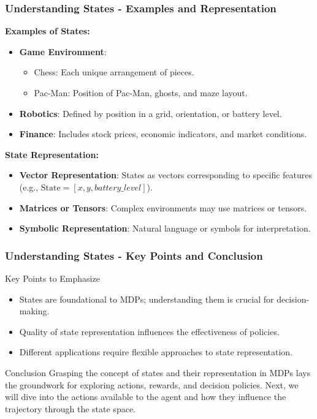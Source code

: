\documentclass[aspectratio=169]{beamer}
\begin{document}
\begin{frame}[fragile]
    \frametitle{Understanding States - Examples and Representation}
    \textbf{Examples of States:}
    \begin{itemize}
        \item \textbf{Game Environment}:
            \begin{itemize}
                \item Chess: Each unique arrangement of pieces.
                \item Pac-Man: Position of Pac-Man, ghosts, and maze layout.
            \end{itemize}
        \item \textbf{Robotics}: Defined by position in a grid, orientation, or battery level.
        \item \textbf{Finance}: Includes stock prices, economic indicators, and market conditions.
    \end{itemize}

    \textbf{State Representation:}
    \begin{itemize}
        \item \textbf{Vector Representation}: States as vectors corresponding to specific features (e.g., $\text{State} = [x, y, battery\_level]$).
        \item \textbf{Matrices or Tensors}: Complex environments may use matrices or tensors.
        \item \textbf{Symbolic Representation}: Natural language or symbols for interpretation.
    \end{itemize}
\end{frame}

\begin{frame}[fragile]
    \frametitle{Understanding States - Key Points and Conclusion}
    \begin{block}{Key Points to Emphasize}
        \begin{itemize}
            \item States are foundational to MDPs; understanding them is crucial for decision-making.
            \item Quality of state representation influences the effectiveness of policies.
            \item Different applications require flexible approaches to state representation.
        \end{itemize}
    \end{block}

    \begin{block}{Conclusion}
        Grasping the concept of states and their representation in MDPs lays the groundwork for exploring actions, rewards, and decision policies. Next, we will dive into the actions available to the agent and how they influence the trajectory through the state space.
    \end{block}
\end{frame}
\end{document}
